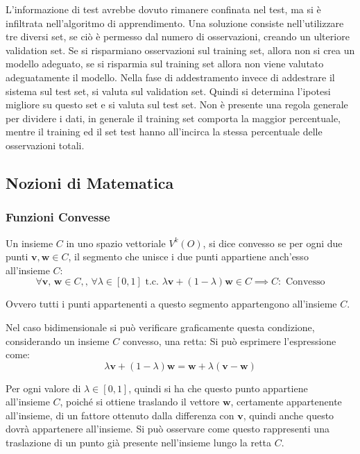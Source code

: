 \documentclass{article}
\numberwithin{equation}{subsection}
\newcommand{\vect}[1]{\boldsymbol{\mathbf{#1}}}
\begin{document}
L'informazione di test avrebbe dovuto rimanere confinata nel test, ma si è infiltrata nell'algoritmo di apprendimento. 
Una soluzione consiste nell'utilizzare tre diversi set, se ciò è permesso dal numero di osservazioni, creando un ulteriore validation set. Se si risparmiano osservazioni sul training set, allora non si crea un modello adeguato, se si risparmia sul training set allora non viene valutato adeguatamente il modello. 
Nella fase di addestramento invece di addestrare il sistema sul test set, si valuta sul validation set. Quindi si determina l'ipotesi migliore su questo set e si valuta sul test set. 
Non è presente una regola generale per dividere i dati, in generale il training set comporta la maggior percentuale, mentre il training ed il set test hanno all'incirca la stessa percentuale delle osservazioni totali. 

\subsection{Nozioni di Matematica}

\subsubsection{Funzioni Convesse}

Un insieme $C$ in uno spazio vettoriale $V^k(O)$, si dice convesso se per ogni due punti $\vect{v},\vect{w}\in C$, il segmento che unisce i due punti appartiene anch'esso all'insieme $C$:
\begin{equation}
    \forall\vect{v},\,\vect{w}\in C,,\,\forall\lambda\in[0,1]\text{ t.c. }\lambda\vect{v}+(1-\lambda)\vect{w}\in C\implies C:\text{ Convesso}
\end{equation}

Ovvero tutti i punti appartenenti a questo segmento appartengono all'insieme $C$. 

Nel caso bidimensionale si può verificare graficamente questa condizione, considerando un 
insieme $C$ convesso, una retta:
Si può esprimere l'espressione come:
\begin{equation*}
    \lambda\vect{v}+(1-\lambda)\vect{w}=\vect{w}+\lambda(\vect{v}-\vect{w})
\end{equation*}

Per ogni valore di $\lambda\in[0,1]$, quindi si ha che questo punto appartiene all'insieme $C$, poiché si ottiene traslando il vettore $\vect{w}$, certamente appartenente all'insieme, 
di un fattore ottenuto dalla differenza con $\vect{v}$, quindi anche questo dovrà appartenere all'insieme. 
Si può osservare come questo rappresenti una traslazione di un punto già presente nell'insieme lungo la retta $C$. 
\end{document}

